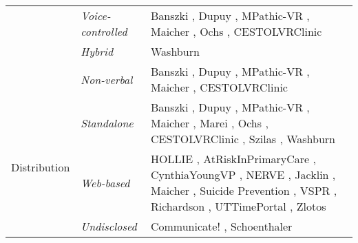\begin{table} [t]
{\begin{center}
\begin{tabular}{| p{1.8cm} | p{2cm} | p{8cm} |}
    \cline{2-3}
        & \emph{Voice-controlled} & Banszki \cite{banszki2018clinical,quail2016student}, Dupuy \cite{dupuy2019virtual}, MPathic-VR \cite{guetterman2019medical,kron2017using}, Maicher \cite{maicher2017developing}, Ochs \cite{ochs2019training}, CESTOLVRClinic \cite{sapkaroski2018implementation}\\
    \cline{2-3}
        & \emph{Hybrid} & Washburn \cite{washburn2020virtual} \\
    \cline{2-3}
        & \emph{Non-verbal} & Banszki \cite{banszki2018clinical,quail2016student}, Dupuy \cite{dupuy2019virtual}, MPathic-VR \cite{guetterman2019medical,kron2017using}, Maicher \cite{maicher2017developing}, CESTOLVRClinic \cite{sapkaroski2018implementation}\\
    \hline
        \multirow{3}{*}{Distribution} & \emph{Standalone} & Banszki \cite{banszki2018clinical,quail2016student}, Dupuy \cite{dupuy2019virtual}, MPathic-VR \cite{guetterman2019medical,kron2017using}, Maicher \cite{maicher2017developing}, Marei \cite{marei2018use}, Ochs \cite{ochs2019training}, CESTOLVRClinic \cite{sapkaroski2018implementation}, Szilas \cite{szilas2019virtual}, Washburn \cite{washburn2020virtual}\\
    \cline{2-3}
        & \emph{Web-based} & HOLLIE \cite{adefila2020students}, AtRiskInPrimaryCare \cite{albright2018using}, CynthiaYoungVP \cite{foster2016using}, NERVE
        \cite{hirumi2016advancingPart2,hirumi2016advancing,kleinsmith2015understanding}, Jacklin \cite{jacklin2019virtual,jacklin2018improving}, Maicher \cite{maicher2017developing}, Suicide Prevention \cite{o2019suicide}, VSPR \cite{peddle2019exploring,peddle2019development}, Richardson \cite{richardson2019virtual}, UTTimePortal \cite{zielke2016beyond,zielke2016using}, Zlotos \cite{zlotos2016scenario}\\
    \cline{2-3}
         & \emph{Undisclosed} &  Communicate! \cite{jeuring2015communicate}, Schoenthaler \cite{schoenthaler2017simulated} \\
    \hline
     \end{tabular}
\end{center}
}
\end{table}
\normalsize
